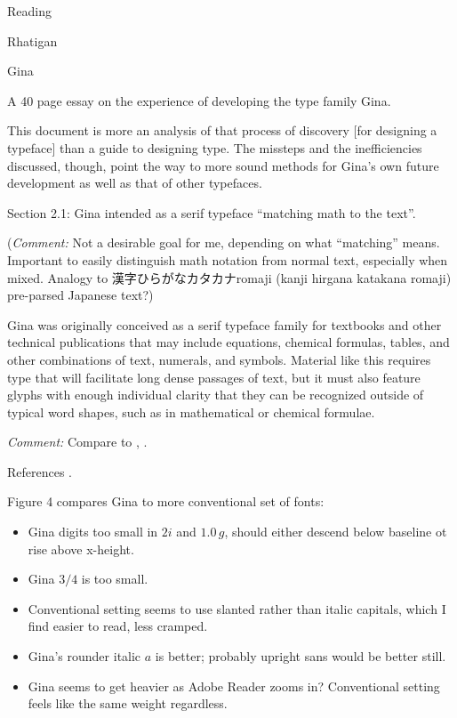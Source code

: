 \documentclass[11pt]{PalisadesLakesBook}
\begin{document}
\begin{plSection}{Reading}
\begin{plSection}{Rhatigan}
\begin{plSection}{Gina}
\begin{plSection}{}
A 40 page essay on the experience of developing the type family
Gina.

\begin{plQuote}{}{}
This document is more an analysis of that process of discovery
[for designing a typeface]
than a guide to designing type.
The missteps and the inefficiencies discussed, though, 
point the way to more sound methods for 
Gina's own future development as well as that of other typefaces.
\end{plQuote}

Section 2.1: Gina intended as a serif typeface 
``matching math to the text''.

(\emph{Comment:} Not a desirable goal for me, depending
on what ``matching'' means.
Important to easily distinguish math notation from normal text,
especially when mixed. 
Analogy to 漢字\allowbreak ひらがな\allowbreak カタカナ\allowbreak romaji
(kanji hirgana katakana romaji) pre-parsed Japanese text?)


\begin{plQuote}{}{}
Gina was originally conceived as a serif typeface family
for textbooks and other technical publications that may include
equations, chemical formulas, tables, and other combinations of
text, numerals, and symbols.
Material like this requires type that will facilitate long dense
passages of text, but it must also feature glyphs with enough
individual clarity that they can be recognized outside of typical
word shapes, such as in mathematical or chemical formulae.
\end{plQuote}

\emph{Comment:} 
Compare to ,
.

References .

Figure 4 compares Gina to more conventional set of fonts:
\begin{itemize}
  \item Gina digits too small in $2i$ and $1.0\,g$, 
  should either descend below baseline ot rise above x-height.
  \item Gina $3/4$ is too small.
  \item Conventional setting seems to use slanted rather 
  than italic capitals, which I find easier to read, less cramped.
  \item Gina's rounder italic $\mathit{a}$ is better; 
  probably upright sans would be better still.
  \item Gina seems to get heavier as Adobe Reader zooms in?
  Conventional setting feels like the same weight regardless. 
\end{itemize}


\end{plSection}
\end{plSection}
\end{plSection}
\end{plSection}
\end{document}
